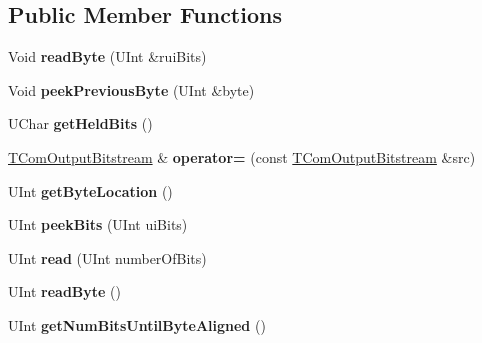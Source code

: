 \subsection*{Public Member Functions}
\begin{DoxyCompactItemize}
\item 
\mbox{\label{class_t_com_input_bitstream_a3eabe89bef2c94dd1518a196f98abe39}} 
Void {\bfseries read\+Byte} (U\+Int \&rui\+Bits)
\item 
\mbox{\label{class_t_com_input_bitstream_a5e5a2b89c98b7504f107e696e0b05d2a}} 
Void {\bfseries peek\+Previous\+Byte} (U\+Int \&byte)
\item 
\mbox{\label{class_t_com_input_bitstream_a0e5465698bdab2315dbfa82c5da215fa}} 
U\+Char {\bfseries get\+Held\+Bits} ()
\item 
\mbox{\label{class_t_com_input_bitstream_ad6ee7885871ae22f355bb63030d2246e}} 
\hyperlink{class_t_com_output_bitstream}{T\+Com\+Output\+Bitstream} \& {\bfseries operator=} (const \hyperlink{class_t_com_output_bitstream}{T\+Com\+Output\+Bitstream} \&src)
\item 
\mbox{\label{class_t_com_input_bitstream_a5deb3b2c6f0680352963bfc1a463fa2c}} 
U\+Int {\bfseries get\+Byte\+Location} ()
\item 
\mbox{\label{class_t_com_input_bitstream_adb1bbf88ab0817c4026cc713687e8b07}} 
U\+Int {\bfseries peek\+Bits} (U\+Int ui\+Bits)
\item 
\mbox{\label{class_t_com_input_bitstream_a7aaab1fce25c2af37e1d84fa6ca583c0}} 
U\+Int {\bfseries read} (U\+Int number\+Of\+Bits)
\item 
\mbox{\label{class_t_com_input_bitstream_a7ee8b7b524ce7280542f8766af13aa90}} 
U\+Int {\bfseries read\+Byte} ()
\item 
\mbox{\label{class_t_com_input_bitstream_a62fe749536724bcf2f34ca32c8646c68}} 
U\+Int {\bfseries get\+Num\+Bits\+Until\+Byte\+Aligned} ()

\end{DoxyCompactItemize}
